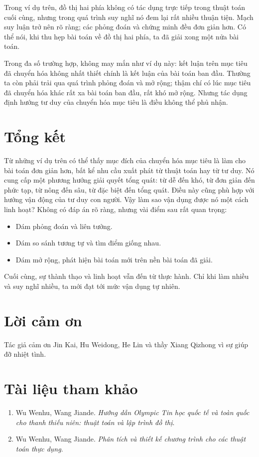 \documentclass[11pt]{article}
\begin{document}
Trong ví dụ trên, đồ thị hai phía không có tác dụng trực tiếp trong thuật toán
cuối cùng, nhưng trong quá trình suy nghĩ nó đem lại rất nhiều thuận tiện.
Mạch suy luận trở nên rõ ràng; các phỏng đoán và chứng minh đều đơn giản hơn.
Có thể nói, khi thu hẹp bài toán về đồ thị hai phía, ta đã giải xong một nửa
bài toán.

Trong đa số trường hợp, không may mắn như ví dụ này: kết luận trên mục tiêu
đã chuyển hóa không nhất thiết chính là kết luận của bài toán ban đầu. Thường
ta còn phải trải qua quá trình phỏng đoán và mở rộng; thậm chí có lúc mục tiêu
đã chuyển hóa khác rất xa bài toán ban đầu, rất khó mở rộng. Nhưng tác dụng
định hướng tư duy của chuyển hóa mục tiêu là điều không thể phủ nhận.

\section{Tổng kết}

Từ những ví dụ trên có thể thấy mục đích của chuyển hóa mục tiêu là làm cho
bài toán đơn giản hơn, bất kể nhu cầu xuất phát từ thuật toán hay từ tư duy.
Nó cung cấp một phương hướng giải quyết tổng quát: từ dễ đến khó, từ đơn giản
đến phức tạp, từ nông đến sâu, từ đặc biệt đến tổng quát. Điều này cũng phù
hợp với hướng vận động của tư duy con người. Vậy làm sao vận dụng được nó một
cách linh hoạt? Không có đáp án rõ ràng, nhưng vài điểm sau rất quan trọng:
\begin{itemize}
  \item Dám phỏng đoán và liên tưởng.
  \item Dám so sánh tương tự và tìm điểm giống nhau.
  \item Dám mở rộng, phát hiện bài toán mới trên nền bài toán đã giải.
\end{itemize}

Cuối cùng, sự thành thạo và linh hoạt vẫn đến từ thực hành. Chỉ khi làm nhiều
và suy nghĩ nhiều, ta mới đạt tới mức vận dụng tự nhiên.

\section*{Lời cảm ơn}

Tác giả cảm ơn Jin Kai, Hu Weidong, He Lin và thầy Xiang Qizhong vì sự giúp
đỡ nhiệt tình.

\section*{Tài liệu tham khảo}

\begin{enumerate}
  \item Wu Wenhu, Wang Jiande. \textit{Hướng dẫn Olympic Tin học quốc tế và
  toàn quốc cho thanh thiếu niên: thuật toán và lập trình đồ thị}.
  \item Wu Wenhu, Wang Jiande. \textit{Phân tích và thiết kế chương trình cho
  các thuật toán thực dụng}.
\end{enumerate}
\end{document}
